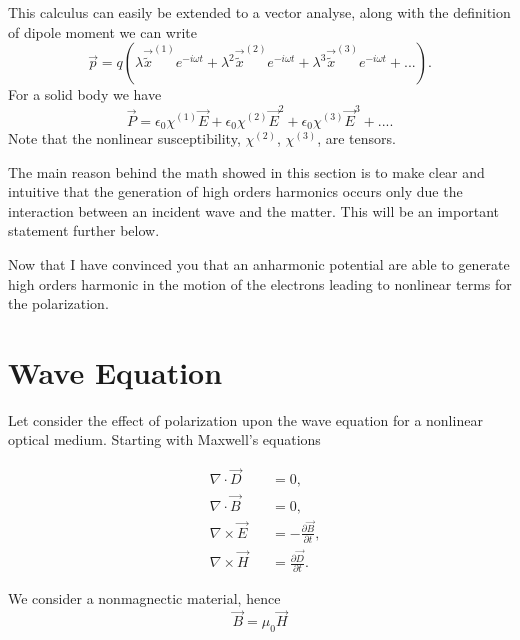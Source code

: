 This calculus can easily be extended to a vector analyse, along with the definition of dipole moment we can write
\begin{equation}
    \vec{p} = q\left(\lambda\vec{\tilde{x}}^{(1)}e^{-i\omega t}+\lambda^2\vec{\tilde{x}}^{(2)}e^{-i\omega t}+\lambda^3\vec{\tilde{x}}^{(3)}e^{-i\omega t}+... \right).
\end{equation}
For a solid body we have
\begin{equation}
    \vec{P} = \epsilon_0\chi^{(1)}\vec{E} + \epsilon_0\chi^{(2)}\vec{E}^2+\epsilon_0\chi^{(3)}\vec{E}^3+....
\label{eq:nonlim_pol}
\end{equation}
Note that the nonlinear susceptibility, $\chi^{(2)}$, $\chi^{(3)}$, are tensors.

The main reason behind the math showed in this section is to make clear and intuitive that the generation of high orders harmonics occurs only due the interaction between an incident wave and the matter. This will be an important statement further below. 

Now that I have convinced you that an anharmonic potential are able to generate high orders harmonic in the motion of the electrons leading to nonlinear terms for the polarization.%

\section{Wave Equation}

Let consider the effect of polarization upon the wave equation for a nonlinear optical medium. Starting with Maxwell's equations

\begin{subequations}
    \begin{alignat}{2}
        &\nabla\cdot\vec{D}  &&= 0,\\
        &\nabla\cdot\vec{B}  &&= 0,\\
        &\nabla\times\vec{E} &&= -\frac{\partial\vec{B}}{\partial t},\\ 
        &\nabla\times\vec{H} &&= \frac{\partial\vec{D}}{\partial t}.
    \end{alignat}
    \label{eq:max_eq}
\end{subequations}

We consider a nonmagnectic material, hence
\begin{equation}
    \vec{B} = \mu_0 \vec{H}
\end{equation}

